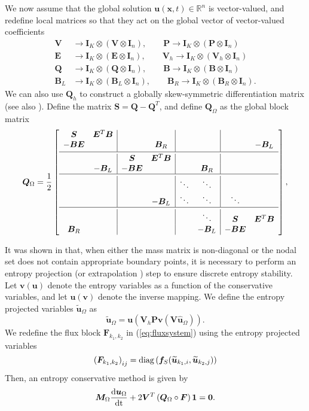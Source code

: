 \documentclass{article}
\renewcommand{\hat}{\widehat}
\renewcommand{\tilde}{\widetilde}
\newcommand{\diag}[1]{{\rm diag}\LRp{#1}}
\newcommand{\td}[2]{\frac{{\rm d}#1}{{\rm d}{\rm #2}}}
\newcommand{\LRp}[1]{\left( #1 \right)}
\newcommand{\LRs}[1]{\left[ #1 \right]}
\newcommand{\eq}[1]{\begin{align*}#1\end{align*}}
\begin{document}
We now assume that the global solution $\bm{u}(\bm{x},t) \in \mathbb{R}^n$ is vector-valued, and redefine local matrices so that they act on the global vector of vector-valued coefficients
\eq{
\bm{V} &\longrightarrow \bm{I}_K \otimes \LRp{\bm{V} \otimes \bm{I}_n}, \qquad \bm{P} \longrightarrow \bm{I}_K \otimes \LRp{\bm{P}  \otimes \bm{I}_n}\\ 
\bm{E} &\longrightarrow \bm{I}_K \otimes \LRp{\bm{E}  \otimes \bm{I}_n}, \qquad \bm{V}_h \longrightarrow \bm{I}_K \otimes \LRp{\bm{V}_h  \otimes \bm{I}_n}\\
\bm{Q} &\longrightarrow \bm{I}_K \otimes \LRp{\bm{Q}  \otimes \bm{I}_n}, \qquad \bm{B} \longrightarrow \bm{I}_K \otimes \LRp{\bm{B}  \otimes \bm{I}_n}\\
\bm{B}_L &\longrightarrow \bm{I}_K \otimes \LRp{\bm{B}_L  \otimes \bm{I}_n}, \qquad \bm{B}_R \longrightarrow \bm{I}_K \otimes \LRp{\bm{B}_R  \otimes \bm{I}_n}.
}
We can also use $\bm{Q}_h$ to construct a globally skew-symmetric differentiation matrix (see also \cite{chan2018efficient}).  Define the matrix $\bm{S} = \bm{Q}-\bm{Q}^T$, and define $\bm{Q}_{\Omega}$ as the global block matrix
\[
\bm{Q}_{\Omega} = \frac{1}{2}\LRs{\begin{array}{cc|cc|cc|cc}
\bm{S} &  \bm{E}^T\bm{B} & &&& && \\
 - \bm{B}\bm{E} &  & & \bm{B}_R && && -\bm{B}_L\\ [.2em]
 \hline\\[-1.0em]
&& \bm{S} &  \bm{E}^T\bm{B}&&&& \\
& -\bm{B}_L &  - \bm{B}\bm{E} &&& \bm{B}_R&&\\
 \hline\\[-1.0em]
&&&& \ddots & \ddots&  \\
&&&   -\bm{B}_L & \ddots&\ddots&   \ddots&\\
 \hline\\[-1.0em]
&&&&&\ddots& \bm{S} &  \bm{E}^T\bm{B} \\
\bm{B}_R &&& &&-\bm{B}_L &  - \bm{B}\bm{E} &\\
\end{array}},
\]


It was shown in \cite{parsani2016entropy, chan2017discretely} that, when either the mass matrix is non-diagonal or the nodal set does not contain appropriate boundary points, it is necessary to perform an entropy projection (or extrapolation \cite{chenreview}) step to ensure discrete entropy stability.  Let $\bm{v}(\bm{u})$ denote the entropy variables as a function of the conservative variables, and let $\bm{u}(\bm{v})$ denote the inverse mapping.  We define the entropy projected variables $\tilde{\bm{u}}_{\Omega}$ as
\[
\tilde{\bm{u}}_{\Omega} = \bm{u}\LRp{\bm{V}_h\bm{P}\bm{v}\LRp{\bm{V}\hat{\bm{u}}_{\Omega}}}.
\]
We redefine the flux block $\bm{F}_{k_1,k_2}$ in (\ref{eq:fluxsystem}) using the entropy projected variables
\[
\LRp{\bm{F}_{k_1,k_2}}_{ij} = \diag{\bm{f}_S(\tilde{\bm{u}}_{k_1,i}, \tilde{\bm{u}}_{k_2,j})}
\]
Then, an entropy conservative method is given by 
\[
\bm{M}_{\Omega}\td{\bm{u}_{\Omega}}{t} + 2\bm{V}^T\LRp{ \bm{Q}_{\Omega} \circ \bm{F}}\bm{1} = \bm{0}.  
\]
\end{document}
